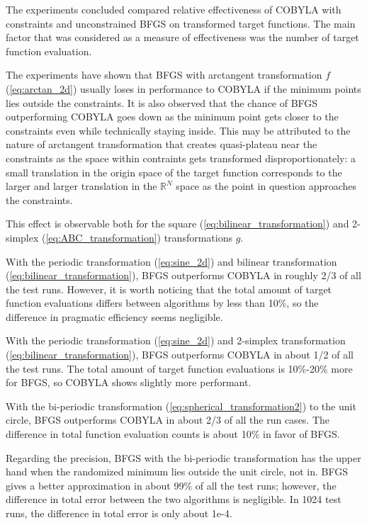 \documentclass[
	a4paper, %
	10pt, %
	unnumberedsections, %
	twoside, %
]{LTJournalArticle}
\begin{document}
The experiments concluded compared relative effectiveness of COBYLA with constraints \cite{Powell:1994} and unconstrained BFGS \cite{fletcher:1987} on transformed target functions. The main factor that was considered as a measure of effectiveness was the number of target function evaluation.

The experiments have shown that BFGS with arctangent transformation $f$ (\ref{eq:arctan_2d}) usually loses in performance to COBYLA if the minimum points lies outside the constraints. It is also observed that the chance of BFGS outperforming COBYLA goes down as the minimum point gets closer to the constraints even while technically staying inside. This may be attributed to the nature of arctangent transformation that creates quasi-plateau near the constraints as the space within contraints gets transformed disproportionately: a small translation in the origin space of the target function corresponds to the larger and larger translation in the $\mathbb{R}^N$ space as the point in question approaches the constraints. 

This effect is observable both for the square (\ref{eq:bilinear_transformation}) and 2-simplex (\ref{eq:ABC_transformation}) transformations $g$. 

With the periodic transformation (\ref{eq:sine_2d}) and bilinear transformation (\ref{eq:bilinear_transformation}), BFGS outperforms COBYLA in roughly 2/3 of all the test runs. However, it is worth noticing that the total amount of target function evaluations differs between algorithms by less than 10\%, so the difference in pragmatic efficiency seems negligible.

With the periodic transformation (\ref{eq:sine_2d}) and 2-simplex transformation (\ref{eq:bilinear_transformation}), BFGS outperforms COBYLA in about 1/2 of all the test runs. The total amount of target function evaluations is 10\%-20\% more for BFGS, so COBYLA shows slightly more performant.

With the bi-periodic transformation (\ref{eq:spherical_transformation2}) to the unit circle, BFGS outperforms COBYLA in about 2/3 of all the run cases. The difference in total function evaluation counts is about 10\% in favor of BFGS.

Regarding the precision, BFGS with the bi-periodic transformation has the upper hand when the randomized minimum lies outside the unit circle, not in. BFGS gives a better approximation in about 99\% of all the test runs; however, the difference in total error between the two algorithms is negligible. In 1024 test runs, the difference in total error is only about 1e-4.
\end{document}

